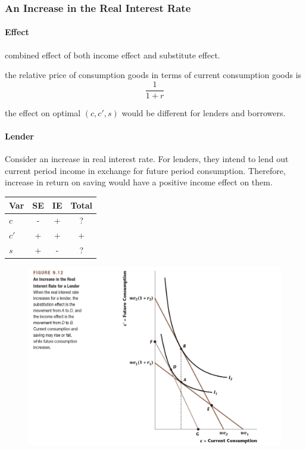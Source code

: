 \documentclass[11pt]{article}
\begin{document}
		\newpage
		\subsubsection{An Increase in the Real Interest Rate}
		\paragraph{Effect} combined effect of both income effect and substitute effect.
		
		\begin{remark}
			the relative price of consumption goods in terms of current consumption goods is
			\[
				\frac{1}{1+r}
			\]
		\end{remark}
		
		\begin{remark}
			the effect on optimal $(c, c', s)$ would be different for lenders and borrowers.
		\end{remark}
		
		\paragraph{Lender} Consider an increase in real interest rate. For lenders, they intend to lend out current period income in exchange for future period consumption. Therefore, increase in return on saving would have a positive income effect on them.
		
		\begin{center}
			\begin{tabular}{l|ccc}
				Var & SE & IE & Total\\
				\hline
				$c$ & - & + & ?\\
				$c'$ & + & + & +\\
				$s$ & + & - & ? \\
			\end{tabular}
		\end{center}
		\begin{figure}[h]
			\centering
			\includegraphics[width=\linewidth]{figures/912}
		\end{figure}
\end{document}
